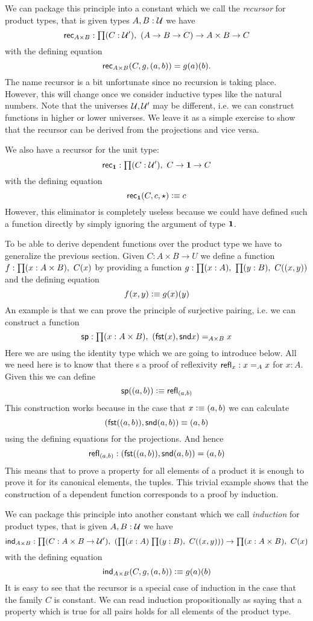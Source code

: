 We can package this principle into a constant which we call the
\emph{recursor} for product
types, that is given types $A,B : \mathcal{U}$ we have
\[\rec{A\times B} : \prd{C:\UU'}(A \to B \to C) \to A \times B \to C\]
with the defining equation
\[\mathsf{rec}_{A\times B}(C,g,( a,b)) = g(a)(b). \]
The name recursor is a bit unfortunate since no recursion is taking
place. However, this will change once we consider inductive types like
the natural numbers.
Note that the universes $\mathcal{U},\mathcal{U}'$ may be different, i.e. we can
construct functions in higher or lower universes. 
We leave it as a simple exercise to show that the recursor can be
derived from the projections and vice versa.

We also have a recursor for the unit type:
\[\rec{\unit} : \prd{C:\UU'}C \to \unit \to C\]
with the defining equation
\[ \mathsf{rec}_{\mathbf{1}}(C,c,\star) \vcentcolon\equiv c \]
However, this eliminator is completely useless
because we could have defined such a function directly
by simply ignoring the argument of type $\mathbf{1}$.

To be able to derive dependent functions over the product type we have
to generalize the previous section. Given $C: A \times B \to U$ we
define a function $f : \prd{x : A \times B} C(x)$ by providing a
function $g : \prd{x:A}\prd{y:B} C(\tup{x}{y})$ and the defining equation
\[ f(x,y) \vcentcolon\equiv g(x)(y) \] 
An example is that we can prove the principle of surjective pairing, i.e.
we can construct a function
\[ \spr : \prd{x:A \times B} \tup{\fst(x)}{\snd{x}} =_{A\times B} x \]
Here we are using the identity type which we are going to introduce below. All
we need here is to know that there s a proof of reflexivity $\mathsf{refl}_{x} : x =_A x$ for $x:A$. 
Given this we can define
\[ \mathsf{sp}(( a,b)) \vcentcolon\equiv \mathsf{refl}_{( a,b)} \]
This construction works because in the case that $x \vcentcolon\equiv ( a,b)$ we can 
calculate 
\[ ( \mathsf{fst}(( a,b)),\mathsf{snd}{( a,b)}) \equiv ( a,b) \]
using the defining equations for the projections. And hence 
\[ \mathsf{refl}_{( a,b)} : ( \mathsf{fst}(( a,b)),\mathsf{snd}{( a,b)}) = ( a,b) \]
This means that to prove a property for all elements of a product it is enough 
to prove it for its canonical elements, the tuples. This trivial example shows that the construction of a dependent function corresponds to a proof by induction.

We can package this principle into another constant which we call
\emph{induction} for product types, that is given $A,B : \mathcal{U}$ we have
\[ \ind{A\times B} : \prd{C:A \times B \to \UU'} (\prd{x:A}{y:B}
C(\tup{x}{y})) \to \prd{x:A \times B} C(x) \]
with the defining equation 
\[ \mathsf{ind}_{A\times B}(C,g,( a,b)) \vcentcolon\equiv g(a)(b) \]
It is easy to see that the recursor is a special case of induction
in the case that the family $C$ is constant.
We can read induction propositionally as saying that a property which
is true for all pairs holds for all elements of the product type.

